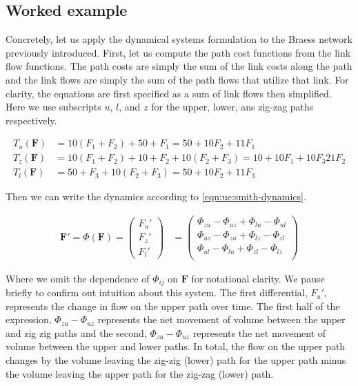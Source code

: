 
\subsection{Worked example}

Concretely, let us apply the dynamical systems formulation to the Braess network previously introduced.
First, let us compute the path cost functions from the link flow functions.
The path costs are simply the sum of the link costs along the path and the link flows are simply the sum of the path flows that utilize that link.
For clarity, the equations are first specified as a sum of link flows then simplified.
Here we use subscripts $u$, $l$, and $z$ for the upper, lower, ans zig-zag paths respectively. 

\begin{align}
    T_u(\mathbf{F}) &= 10(F_1+F_2) + 50 + F_1 = 50 + 10F_2 + 11F_1\\
    T_z(\mathbf{F}) &= 10(F_1+F_2) + 10 + F_2 + 10(F_2 + F_3) = 10 + 10 F_1 + 10F_3 21F_2 \\
    T_l(\mathbf{F}) &= 50 + F_3 + 10 (F_2 + F_3) = 50 + 10F_2 + 11F_3
\end{align}

Then we can write the dynamics according to \eqref{eqn:ue:smith-dynamics}.

\begin{align}
    \mathbf{F}' = \Phi(\mathbf{F}) = 
        \begin{pmatrix}
           F_u'\\
           F_z'\\
           F_l'
        \end{pmatrix} &=
        \begin{pmatrix}
            \Phi_{zu} - \Phi_{uz} + \Phi_{lu} - \Phi_{ul}\\
            \Phi_{uz} - \Phi_{zu} + \Phi_{lz} - \Phi_{zl}\\
            \Phi_{ul} - \Phi_{lu} + \Phi_{zl} - \Phi_{lz}\\
        \end{pmatrix}
\end{align}

Where we omit the dependence of $\Phi_{ij}$ on $\mathbf{F}$ for notational clarity.
We pause briefly to confirm out intuition about this system. 
The first differential, $F_u'$, represents the change in flow on the upper path over time.
The first half of the expression, $\Phi_{zu} - \Phi_{uz}$ represents the net movement of volume between the upper and zig zig paths and the second,  $\Phi_{zu} - \Phi_{uz}$ represents the net movement of volume between the upper and lower paths.
In total, the flow on the upper path changes by the volume leaving the zig-zig (lower) path for the upper path minus the volume leaving the upper path for the zig-zag (lower) path. 

